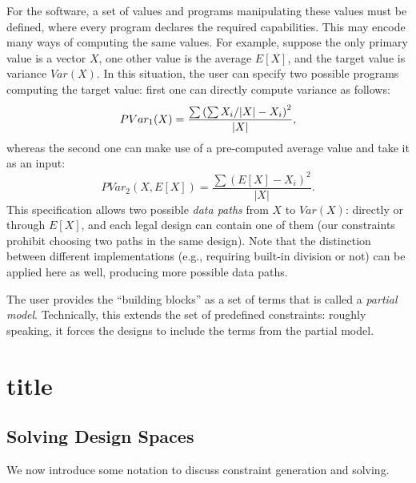 \documentclass[conference]{IEEEtran}
\begin{document}
For the software, a set of values and programs manipulating these values must be defined, where every program declares the required capabilities. This may encode many ways of computing the same values. For example, suppose the only primary value is a vector $X$, one other value is the average $E[X]$, and the target value is variance $Var(X)$. In this situation, the user can specify two possible programs computing the target value: first one can directly compute variance as follows:
$$PVar_1(X) = \frac{\sum \left( \sum X_i \middle/ |X| - X_i \right)^2}{|X|},$$
whereas the second one can make use of a pre-computed average value and take it as an input:
$$PVar_2(X, E[X]) = \frac{\sum \left( E[X] - X_i \right)^2}{|X|}.$$
This specification allows two possible \emph{data paths} from $X$ to $Var(X)$: directly or through $E[X]$, and each legal design can contain one of them (our constraints prohibit choosing two paths in the same design). Note that the distinction between different implementations (e.g., requiring built-in division or not) can be applied here as well, producing more possible data paths.

The user provides the ``building blocks'' as a set of terms that is called a \emph{partial model}. Technically, this extends the set of predefined constraints: roughly speaking, it forces the designs to include the terms from the partial model. 

\section{title}

\subsection{Solving Design Spaces}
We now introduce some notation to discuss constraint generation and solving. 
\end{document}
